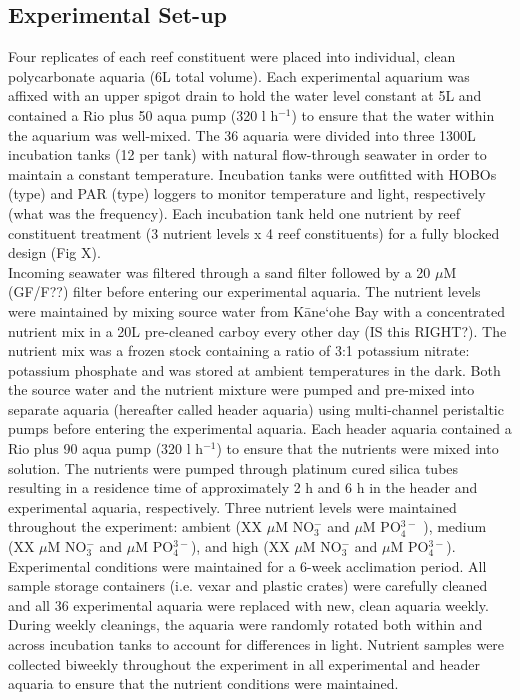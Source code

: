 \documentclass[]{rsos}%
\begin{document}
\subsection{Experimental Set-up}
Four replicates of each reef constituent were placed into individual, clean polycarbonate aquaria (6L total volume). Each experimental aquarium was affixed with an upper spigot drain to hold the water level constant at 5L and contained a Rio plus 50 aqua pump (320 l h$^{-1}$) to ensure that the water within the aquarium was well-mixed. The 36 aquaria were divided into three 1300L incubation tanks (12 per tank) with natural flow-through seawater in order to maintain a constant temperature. Incubation tanks were outfitted with HOBOs (type) and PAR (type) loggers to monitor temperature and light, respectively (what was the frequency). Each incubation tank held one nutrient by reef constituent treatment (3 nutrient levels x 4 reef constituents) for a fully blocked design (Fig X).  \\
\indent Incoming seawater was filtered through a sand filter followed by a 20 $\mu$M  (GF/F??) filter before entering our experimental aquaria. The nutrient levels were maintained by mixing source water from K\={a}ne`ohe Bay with a concentrated nutrient mix in a 20L pre-cleaned carboy every other day (IS this RIGHT?). The nutrient mix was a frozen stock containing a ratio of 3:1 potassium nitrate: potassium phosphate and was stored at ambient temperatures in the dark. Both the source water and the nutrient mixture were pumped and pre-mixed into separate aquaria (hereafter called header aquaria) using multi-channel peristaltic pumps before entering the experimental aquaria. Each header aquaria contained a  Rio plus 90 aqua pump (320 l h$^{-1}$) to ensure that the nutrients were mixed into solution. The nutrients were pumped through platinum cured silica tubes resulting in a residence time of approximately 2 h and 6 h in the header and experimental aquaria, respectively. Three nutrient levels were maintained throughout the experiment: ambient (XX $\mu$M NO$_{3}^{-}$ and $\mu$M PO$_{4}^{3-}$ ), medium (XX $\mu$M NO$_{3}^{-}$ and $\mu$M PO$_{4}^{3-}$), and high (XX $\mu$M NO$_{3}^{-}$ and $\mu$M PO$_{4}^{3-}$).  \\
\indent Experimental conditions were maintained for a 6-week acclimation period. All sample storage containers (i.e. vexar and plastic crates) were carefully cleaned and all 36 experimental aquaria were replaced with new, clean aquaria weekly. During weekly cleanings, the aquaria were randomly rotated both within and across incubation tanks to account for differences in light. Nutrient samples were collected biweekly throughout the experiment in all experimental and header aquaria to ensure that the nutrient conditions were maintained.
\end{document}
